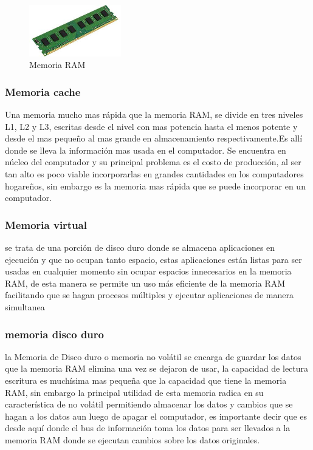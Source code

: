 \documentclass{article}
\begin{document}
        \begin{figure}[h]
        \includegraphics[width=4cm]{ram.jpg}
        \centering
        \caption{Memoria RAM}
        \label{fig:Memoria RAM}
        \end{figure}    
        
        
        \subsubsection{Memoria cache}
        Una memoria mucho mas rápida que la memoria RAM, se divide en tres niveles L1, L2 y L3, escritas desde el nivel con mas potencia hasta el menos potente y desde el mas pequeño al mas grande en almacenamiento respectivamente.Es allí donde se lleva la información mas usada en el computador. Se encuentra en núcleo del computador y su principal problema es el costo de producción, al ser tan alto es poco viable incorporarlas en grandes cantidades en los computadores hogareños, sin embargo es la memoria mas rápida que se puede incorporar en un computador.   
        
        \subsubsection{Memoria virtual}
        se trata de una porción de disco duro donde se almacena aplicaciones en ejecución y que no ocupan tanto espacio, estas aplicaciones están listas para ser usadas en cualquier momento sin ocupar espacios innecesarios en la memoria RAM, de esta manera se permite un uso más eficiente de la memoria RAM facilitando que se hagan procesos múltiples y ejecutar aplicaciones de manera simultanea 
        
        \subsubsection{memoria disco duro}
        la Memoria de Disco duro o memoria no volátil se encarga de guardar los datos que la memoria RAM elimina una vez se dejaron de usar, la capacidad de lectura  escritura es muchísima mas pequeña que la capacidad que tiene la memoria RAM, sin embargo la principal utilidad de esta memoria radica en su característica de no volátil permitiendo almacenar los datos y cambios que se hagan a los datos aun luego de apagar el computador, es importante decir que es desde aquí donde el bus de información toma los datos para ser llevados a la memoria RAM donde se ejecutan cambios sobre los datos originales. 
        
\end{document}
